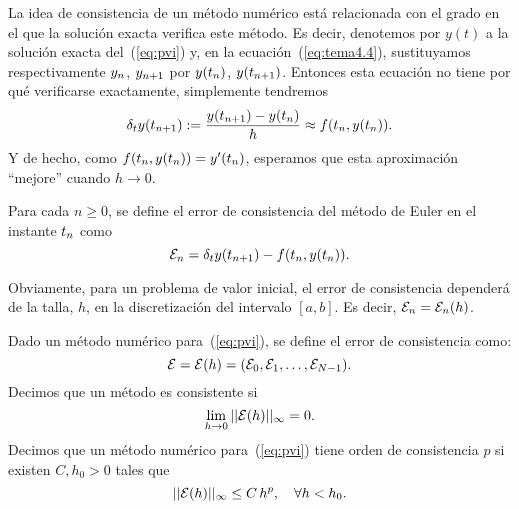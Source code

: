 La idea de consistencia de un método numérico está relacionada con el
grado en el que la solución exacta verifica este método. Es decir,
denotemos por $y(t)$ a la solución exacta del~(\ref{eq:pvi}) y, en la
ecuación~(\ref{eq:tema4.4}), sustituyamos  respectivamente
${y_n}$, ${y_{n+1}}$ por $y({t_n})$, $y({t_{n+1}})$. Entonces esta ecuación no tiene por qué verificarse exactamente, simplemente tendremos
\begin{equation*}
  \delta_t y({t_{n+1}}) :=
  \frac{y({t_{n+1}})-y({t_n})}{h} \approx f({t_n},y({t_n})).
\end{equation*}
Y de hecho, como $f({t_n},y({t_n}))=y'({t_n})$, esperamos que esta aproximación ``mejore'' cuando $h\to 0$.
\begin{definition}
  \label{def:error-consistencia-euler}
  Para cada $n\ge 0$, se define el error de consistencia del método de
  Euler en el instante ${t_n}$ como
  \begin{equation}
    \label{eq:consistencia-euler}
    {\cal E}_{n} = \delta_t y({t_{n+1}})-f({t_n},y({t_n})).
  \end{equation}
\end{definition}
Obviamente, para un problema de valor inicial, el error de
consistencia dependerá de la talla, $h$, en la discretización del
intervalo $[a,b]$. Es decir, ${\cal E}_n={\cal E}_n(h)$.

\begin{definition}
  \label{def:consitencia-metodo-pvi}
  Dado un método numérico para~(\ref{eq:pvi}), se define el error de consistencia
  como:
  \begin{equation*}
    {\cal E} = {\cal E}(h) = ({\cal E}_0, {\cal E}_1,\dots,{\cal E}_{N-1}).
  \end{equation*}
  Decimos que un método es consistente si
  \begin{equation*}
    \lim_{h\to 0} ||{\cal E}(h)||_\infty = 0.
  \end{equation*}
  Decimos que un método numérico para~(\ref{eq:pvi}) tiene orden de
  consistencia $p$ si existen $C, h_0>0$ tales que
  \begin{equation*}
    ||{\cal E}(h)||_\infty \le C\, h^p, \quad \forall h<h_0.
  \end{equation*}
\end{definition}

